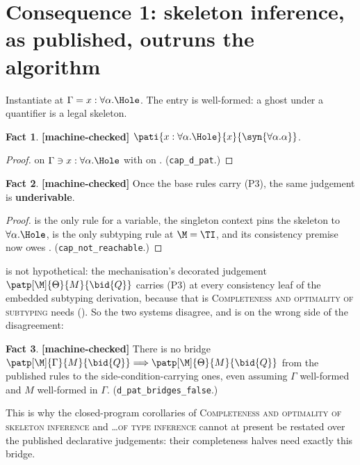 \documentclass[11pt,a4paper]{article}
\theoremstyle{definition}
\newtheorem{factc}{Fact}
\newcommand{\coq}[1]{\texttt{\small #1}}
\newcommand{\MC}{\textbf{[machine-checked]}\xspace}
\newcommand{\Scex}{\forall\alpha.\Hole}
\newcommand{\Pcex}{\forall\alpha.\alpha}
\begin{document}
\section{Consequence 1: skeleton inference, as published, outruns the
  algorithm}\label{sec:inference}

Instantiate  at $\Gamma = x : \Scex$.  The entry is
well-formed: a ghost under a quantifier is a legal skeleton.

\begin{factc}\label{fact:pat} \MC
  $\pati{x:\Scex}{x}{\syn{\Pcex}}$.
\end{factc}

\begin{proof}
   on $\Gamma\ni x:\Scex$ with  on
  .  (\coq{cap\_d\_pat}.)
\end{proof}

\begin{factc}\label{fact:notreach} \MC
  Once the base rules carry (P3), the same judgement is
  \textbf{underivable}.
\end{factc}

\begin{proof}
   is the only rule for a variable, the singleton context
  pins the skeleton to $\Scex$,  is the only subtyping rule
  at $\M=\TI$, and its consistency premise now owes
  .  (\coq{cap\_not\_reachable}.)
\end{proof}

\noindent
{} is not hypothetical: the mechanisation's
decorated judgement $\patp[\M]{\Theta}{M}{\bid{Q}}$ carries (P3) at every
consistency leaf of the embedded subtyping derivation, because that is
\textsc{Completeness and optimality of subtyping} needs ().  So the two systems
disagree, and  is on the wrong side of the disagreement:

\begin{factc}\label{fact:bridge} \MC
  There is no bridge
  $\patp[\M]{\Gamma}{M}{\bid{Q}} \Longrightarrow
   \patp[\M]{\Theta}{M}{\bid{Q}}$ from the published rules to the
  side-condition-carrying ones, even assuming $\Gamma$ well-formed and
  $M$ well-formed in $\Gamma$.  (\coq{d\_pat\_bridges\_false}.)
\end{factc}

\noindent
This is why the closed-program corollaries of \textsc{Completeness and
optimality of skeleton inference} and \textsc{\dots of type inference}
cannot at present be restated over the published declarative judgements: their completeness halves need exactly this
bridge.
\end{document}
